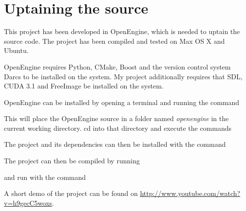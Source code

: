 \chapter{Uptaining the source}

This project has been developed in OpenEngine, which is needed to uptain the
source code. The project has been compiled and tested on Max OS X and Ubuntu.

OpenEngine requires Python, CMake, Boost and the version control system Darcs to
be installed on the system. My project additionally requires that SDL, CUDA 3.1
and FreeImage be installed on the system.

OpenEngine can be installed by opening a terminal and running the
command


This will place the OpenEngine source in a folder named \textit{openengine} in
the current working directory. cd into that directory and execute the commands



The project and its dependencies can then be installed with the command


The project can then be compiled by running 


and run with the command


A short demo of the project can be found on
\url{http://www.youtube.com/watch?v=h9gecC5woxs}.
